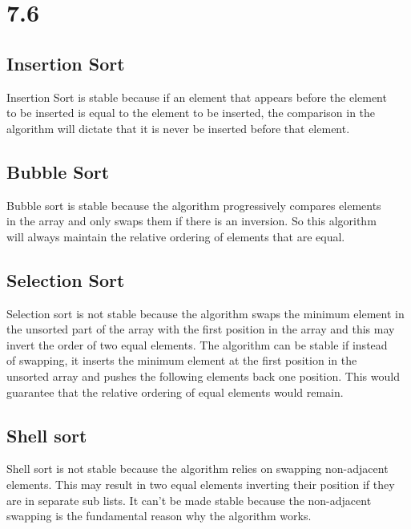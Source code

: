 \documentclass[11pt]{article}
\begin{document}
\section{7.6}
\label{sec:org23f1dbe}
\subsection{Insertion Sort}
\label{sec:org7aa3df5}
Insertion Sort is stable because if an element that appears before the element\\
to be inserted is equal to the element to be inserted, the comparison in the\\
algorithm will dictate that it is never be inserted before that element.\\
\subsection{Bubble Sort}
\label{sec:org4340dfe}
Bubble sort is stable because the algorithm progressively compares elements\\
in the array and only swaps them if there is an inversion. So this algorithm\\
will always maintain the relative ordering of elements that are equal.\\
\subsection{Selection Sort}
\label{sec:org177af6d}
Selection sort is not stable because the algorithm swaps the minimum element in\\
the unsorted part of the array with the first position in the array and this may\\
invert the order of two equal elements. The algorithm can be stable if instead\\
of swapping, it inserts the minimum element at the first position in the\\
unsorted array and pushes the following elements back one position. This would\\
guarantee that the relative ordering of equal elements would remain.\\
\subsection{Shell sort}
\label{sec:orgc9c92f5}
Shell sort is not stable because the algorithm relies on swapping non-adjacent\\
elements. This may result in two equal elements inverting their position if they\\
are in separate sub lists. It can't be made stable because the non-adjacent\\
swapping is the fundamental reason why the algorithm works.\\
\end{document}
